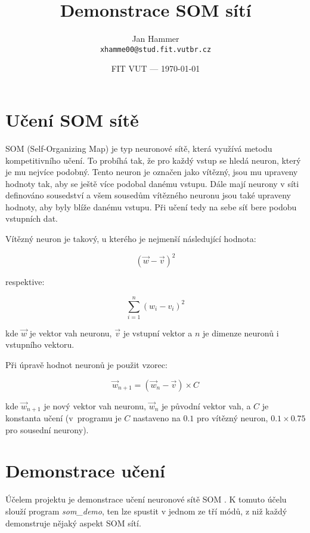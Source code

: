 \documentclass[11pt]{article}
\title{Demonstrace SOM sítí} %
\author{Jan Hammer\\ \texttt{xhamme00@stud.fit.vutbr.cz}} %
\date{FIT VUT --- \today} %
\begin{document}
\maketitle %

\section*{Učení SOM sítě}
SOM (Self-Organizing Map) je typ neuronové sítě, která využívá metodu kompetitivního učení. To probíhá tak, že pro každý vstup se hledá neuron, který je mu nejvíce podobný. Tento neuron je označen jako vítězný, jsou mu upraveny hodnoty tak, aby se ještě více podobal danému vstupu. Dále mají neurony v síti definováno sousedství a všem sousedům vítězného neuronu jsou také upraveny hodnoty, aby byly blíže danému vstupu. Při učení tedy na sebe síť bere podobu vstupních dat.

Vítězný neuron je takový, u kterého je nejmenší následující hodnota:

$$(\overrightarrow{w} - \overrightarrow{v})^2$$

respektive: 

$$ \sum_{i=1}^{n} (w_i - v_i)^2$$

kde $\overrightarrow{w}$ je vektor vah neuronu, $\overrightarrow{v}$ je vstupní vektor a $n$ je dimenze neuronů i vstupního vektoru.



Při úpravě hodnot neuronů je použit vzorec:

$$\overrightarrow{w}_{n+1} = (\overrightarrow{w}_n - \overrightarrow{v}) \times C$$

kde $\overrightarrow{w}_{n+1}$ je nový vektor vah neuronu, $\overrightarrow{w}_n$ je původní vektor vah, a $C$ je konstanta učení (v~programu je $C$ nastaveno na $0.1$ pro vítězný neuron, $0.1 \times 0.75$ pro sousední neurony).

\section*{Demonstrace učení}

Účelem projektu je demonstrace učení neuronové sítě SOM . K tomuto účelu slouží program \textit{som\_demo}, ten lze spustit v jednom ze tří módů, z niž každý demonstruje nějaký aspekt SOM sítí.
\end{document}
